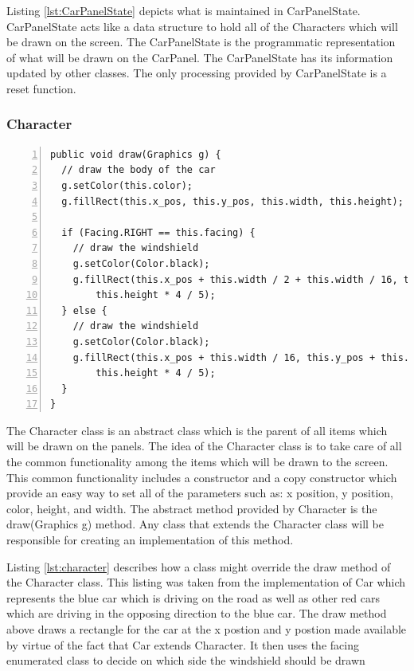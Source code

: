 \documentclass{article} %
\begin{document}
Listing \ref{lst:CarPanelState} depicts what is maintained in CarPanelState.
CarPanelState acts like a data structure to hold all of the Characters which will be drawn on the screen.
The CarPanelState is the programmatic representation of what will be drawn on the CarPanel.
The CarPanelState has its information updated by other classes.
The only processing provided by CarPanelState is a reset function.

\subsubsection{Character}
\begin{lstlisting}[caption={Sample Implementation of a Character},label={lst:character},numbers=left]
public void draw(Graphics g) {
  // draw the body of the car
  g.setColor(this.color);
  g.fillRect(this.x_pos, this.y_pos, this.width, this.height);

  if (Facing.RIGHT == this.facing) {
    // draw the windshield
    g.setColor(Color.black);
    g.fillRect(this.x_pos + this.width / 2 + this.width / 16, this.y_pos + this.height / 10, this.width / 3,
        this.height * 4 / 5);
  } else {
    // draw the windshield
    g.setColor(Color.black);
    g.fillRect(this.x_pos + this.width / 16, this.y_pos + this.height / 10, this.width / 3,
        this.height * 4 / 5);
  }
}
\end{lstlisting}

The Character class is an abstract class which is the parent of all items which will be drawn on the panels.
The idea of the Character class is to take care of all the common functionality among the items which will be drawn to the screen.
This common functionality includes a constructor and a copy constructor which provide an easy way to set all of the parameters such as: x position, y position, color, height, and width.
The abstract method provided by Character is the draw(Graphics g) method.
Any class that extends the Character class will be responsible for creating an implementation of this method.

Listing \ref{lst:character} describes how a class might override the draw method of the Character class.
This listing was taken from the implementation of Car which represents the blue car which is driving on the road as well as other red cars which are driving in the opposing direction to the blue car.
The draw method above draws a rectangle for the car at the x postion and y postion made available by virtue of the fact that Car extends Character.
It then uses the facing enumerated class to decide on which side the windshield should be drawn
\end{document}
